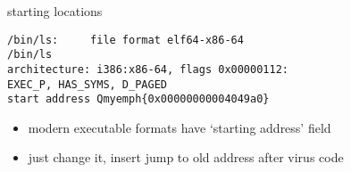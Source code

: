 
\begin{frame}[fragile,label=invokeStarting]{starting locations}
\begin{Verbatim}[fontsize=\fontsize{10}{11}\selectfont,commandchars=Q\{\}]
/bin/ls:     file format elf64-x86-64
/bin/ls
architecture: i386:x86-64, flags 0x00000112:
EXEC_P, HAS_SYMS, D_PAGED
start address Qmyemph{0x00000000004049a0}
\end{Verbatim}
    \begin{itemize}
    \item modern executable formats have `starting address' field
    \item just change it, insert jump to old address after virus code
    \end{itemize}
\end{frame}


